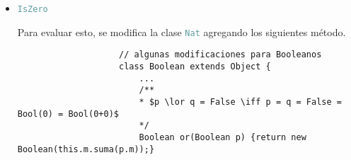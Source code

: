 \documentclass{article}
\newcommand{\tx}[1]{\textcolor{CadetBlue} {\texttt{#1}}}
\begin{document}
\begin{enumerate}
\begin{enumerate}
\begin{itemize}
\begin{verbatim}
                        // $\mathbb{Z} \cong \mathbb{N}^2$
                        Int(Nat i, Nat d) {super(); this.i = i; this.d = d;}

                        // $(x, y) +_{\mathbb{Z}} (z, w) = (x+_{\mathbb{N}}y, z+_{\mathbb{N}}w)$
                        Int suma(Int n) {return new Int(this.i.suma(n.i), this.d.suma(n.d));}

                        // $(x, y) \leq_{\mathbb{Z}} (z, w) \iff xz \leq_{\mathbb{N}} yz$
                        Boolean lt(Int n) {return this.i.suma(n.d).lt(n.i.suma(this.d));}

                        // $-(a, b) = (b, a)$
                        Int neg() {return new Int(this.d, this.i);}
                    }
                \end{verbatim}

                Hay que modificar la clase de \tx{NumExpr} para manejar enteros
                \begin{verbatim}
                    // modificaciones para manejar enteros
                    class NumExpr extends Expr {
                        Int v;

                        NumExpr(Int v) {super(); this.v = v;}
                        ...
                    }
                \end{verbatim}

                Y con estas nuevas modificaciones se define \tx{NegExpr}
                \begin{verbatim}
                    // manejar expresiones con negativos
                    class NegExpr extends Expr {
                        Expr e;

                        NegExpr(Expr e) {this.e = e;}

                        Boolean isAtom() {return (new Booelan(new Nat(this))).false();}

                        Expr eval() {return this.e.eval().neg();}
                    }
                \end{verbatim}
                \item \tx{IsZero}

                Para evaluar esto, se modifica la clase \tx{Nat} agregando los
                siguientes método.

                \begin{verbatim}
                    // algunas modificaciones para Booleanos
                    class Boolean extends Object {
                        ...
                        /**
                        * $p \lor q = False \iff p = q = False = Bool(0) = Bool(0+0)$
                        */
                        Boolean or(Boolean p) {return new Boolean(this.m.suma(p.m));}


\end{verbatim}
\end{itemize}
\end{enumerate}
\end{enumerate}
\end{document}
